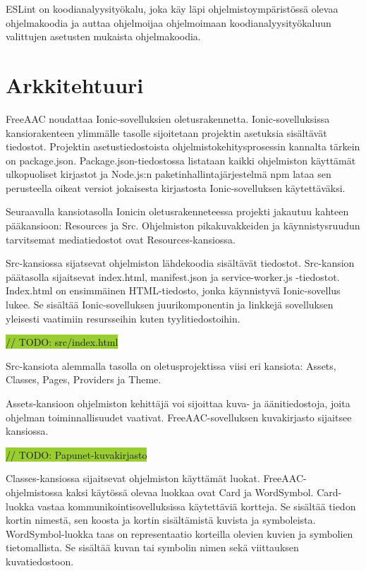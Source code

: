\documentclass[utf8]{gradu3}
\begin{document}
ESLint on koodianalyysityökalu, joka käy läpi ohjelmistoympäristössä olevaa ohjelmakoodia ja auttaa ohjelmoijaa ohjelmoimaan koodianalyysityökaluun valittujen asetusten mukaista ohjelmakoodia.

\section{Arkkitehtuuri}

FreeAAC noudattaa Ionic-sovelluksien oletusrakennetta. Ionic-sovelluksissa kansiorakenteen ylimmälle tasolle sijoitetaan projektin asetuksia sisältävät tiedostot. Projektin asetustiedostoista ohjelmistokehitysprosessin kannalta tärkein on package.json. Package.json-tiedostossa listataan kaikki ohjelmiston käyttämät ulkopuoliset kirjastot ja Node.js:n paketinhallintajärjestelmä npm lataa sen perusteella oikeat versiot jokaisesta kirjastosta Ionic-sovelluksen käytettäväksi.

Seuraavalla kansiotasolla Ionicin oletusrakenneteessa projekti jakautuu kahteen pääkansioon: Resources ja Src. Ohjelmiston pikakuvakkeiden ja käynnistysruudun tarvitsemat mediatiedostot ovat Resources-kansiossa.

Src-kansiossa sijatsevat ohjelmiston lähdekoodia sisältävät tiedostot. Src-kansion päätasolla sijaitsevat index.html, manifest.json ja service-worker.js -tiedostot. Index.html on ensimmäinen HTML-tiedosto, jonka käynnistyvä Ionic-sovellus lukee. Se sisältää Ionic-sovelluksen juurikomponentin ja linkkejä sovelluksen yleisesti vaatimiin resursseihin kuten tyylitiedostoihin.

\colorbox{YellowGreen}{// TODO: src/index.html}

Src-kansiota alemmalla tasolla on oletusprojektissa viisi eri kansiota: Assets, Classes, Pages, Providers ja Theme.

Assets-kansioon ohjelmiston kehittäjä voi sijoittaa kuva- ja äänitiedostoja, joita ohjelman toiminnallisuudet vaativat. FreeAAC-sovelluksen kuvakirjasto sijaitsee kansiossa.

\colorbox{YellowGreen}{// TODO: Papunet-kuvakirjasto}

Classes-kansiossa sijaitsevat ohjelmiston käyttämät luokat. FreeAAC-ohjelmistossa kaksi käytössä olevaa luokkaa ovat Card ja WordSymbol. Card-luokka vastaa kommunikointisovelluksissa käytettäviä kortteja. Se sisältää tiedon kortin nimestä, sen koosta ja kortin sisältämistä kuvista ja symboleista. WordSymbol-luokka taas on representaatio korteilla olevien kuvien ja symbolien tietomallista. Se sisältää kuvan tai symbolin nimen sekä viittauksen kuvatiedostoon.
\end{document}
